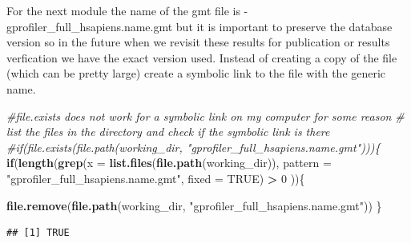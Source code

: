 \documentclass[
]{book}
\newenvironment{Shaded}{\begin{snugshade}}{\end{snugshade}}
\newcommand{\AttributeTok}[1]{\textcolor[rgb]{0.13,0.29,0.53}{#1}}
\newcommand{\CommentTok}[1]{\textcolor[rgb]{0.56,0.35,0.01}{\textit{#1}}}
\newcommand{\ConstantTok}[1]{\textcolor[rgb]{0.56,0.35,0.01}{#1}}
\newcommand{\ControlFlowTok}[1]{\textcolor[rgb]{0.13,0.29,0.53}{\textbf{#1}}}
\newcommand{\DecValTok}[1]{\textcolor[rgb]{0.00,0.00,0.81}{#1}}
\newcommand{\FunctionTok}[1]{\textcolor[rgb]{0.13,0.29,0.53}{\textbf{#1}}}
\newcommand{\NormalTok}[1]{#1}
\newcommand{\OtherTok}[1]{\textcolor[rgb]{0.56,0.35,0.01}{#1}}
\newcommand{\SpecialCharTok}[1]{\textcolor[rgb]{0.81,0.36,0.00}{\textbf{#1}}}
\newcommand{\StringTok}[1]{\textcolor[rgb]{0.31,0.60,0.02}{#1}}
\begin{document}
\begin{Shaded}
\end{Shaded}

For the next module the name of the gmt file is - gprofiler\_full\_hsapiens.name.gmt but it is important to preserve the database version so in the future when we revisit these results for publication or results verfication we have the exact version used. Instead of creating a copy of the file (which can be pretty large) create a symbolic link to the file with the generic name.

\begin{Shaded}
\begin{Highlighting}[]
\CommentTok{\#file.exists does not work for a symbolic link on my computer for some reason}
\CommentTok{\# list the files in the directory and check if the symbolic link is there}
\CommentTok{\#if(file.exists(file.path(working\_dir, "gprofiler\_full\_hsapiens.name.gmt")))\{}
\ControlFlowTok{if}\NormalTok{(}\FunctionTok{length}\NormalTok{(}\FunctionTok{grep}\NormalTok{(}\AttributeTok{x =} \FunctionTok{list.files}\NormalTok{(}\FunctionTok{file.path}\NormalTok{(working\_dir)), }
              \AttributeTok{pattern =} \StringTok{"gprofiler\_full\_hsapiens.name.gmt"}\NormalTok{,}
              \AttributeTok{fixed =} \ConstantTok{TRUE}\NormalTok{) }\SpecialCharTok{\textgreater{}} \DecValTok{0}\NormalTok{ ))\{}

  \FunctionTok{file.remove}\NormalTok{(}\FunctionTok{file.path}\NormalTok{(working\_dir, }\StringTok{"gprofiler\_full\_hsapiens.name.gmt"}\NormalTok{))}
\NormalTok{\}}
\end{Highlighting}
\end{Shaded}

\begin{verbatim}
## [1] TRUE
\end{verbatim}
\end{document}
